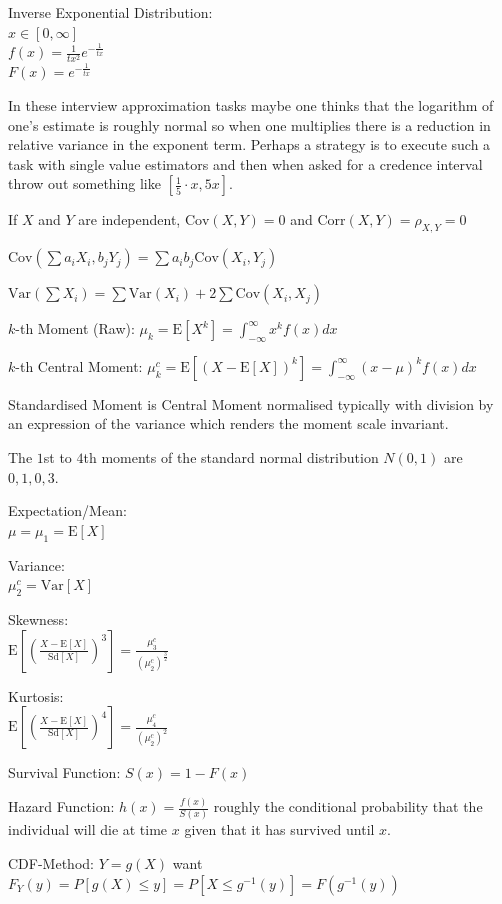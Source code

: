 Inverse Exponential Distribution: \\
$x \in [0,\infty]$ \\
$f(x) = \frac{1}{tx^2} e^{-\frac{1}{tx}}$ \\
$F(x) = e^{-\frac{1}{tx}}$

In these interview approximation tasks maybe one thinks that the logarithm of one's estimate is roughly normal so when one multiplies there is a reduction in relative variance in the exponent term. Perhaps a strategy is to execute such a task with single value estimators and then when asked for a credence interval throw out something like $\left[\frac{1}{5} \cdot x, 5x \right]$.

If $X$ and $Y$ are independent, $\text{Cov}(X,Y)=0$ and $\text{Corr}(X,Y)=\rho_{X,Y}=0$

$\text{Cov}\left(\sum a_i X_i , b_j Y_j \right)=\sum a_i b_j \text{Cov}(X_i,Y_j)$

$\text{Var}\left(\sum X_i \right)=\sum \text{Var}(X_i) + 2 \sum \text{Cov}(X_i,X_j)$

$k$-th Moment (Raw): $\mu_k=\text{E}[X^k]=\int_{-\infty}^{\infty} x^k f(x) dx$

$k$-th Central Moment: $\mu_k^c=\text{E}[(X-\text{E}[X])^k]=\int_{-\infty}^{\infty} (x-\mu)^k f(x) dx$

Standardised Moment is Central Moment normalised typically with division by an expression of the variance which renders the moment scale invariant.

The $1$st to $4$th moments of the standard normal distribution $N(0,1)$ are $0,1,0,3$.

Expectation/Mean: \\
$\mu=\mu_1=\text{E}[X]$

Variance: \\
$\mu_2^c=\text{Var}[X]$

Skewness: \\
$\text{E}\left[ \left( \frac{X-\text{E}[X]}{\text{Sd}[X]} \right)^3\right]=\frac{\mu_3^c}{(\mu_2^c)^{\frac{3}{2}}}$

Kurtosis: \\
$\text{E}\left[ \left( \frac{X-\text{E}[X]}{\text{Sd}[X]} \right)^4\right]=\frac{\mu_4^c}{(\mu_2^c)^2}$

Survival Function: $S(x)=1-F(x)$

Hazard Function: $h(x)=\frac{f(x)}{S(x)}$ roughly the conditional probability that the individual will die at time $x$ given that it has survived until $x$.

CDF-Method: $Y=g(X)$ want $F_Y(y)=P[g(X)\le y]=P[X\le g^{-1}(y)]=F(g^{-1}(y))$

